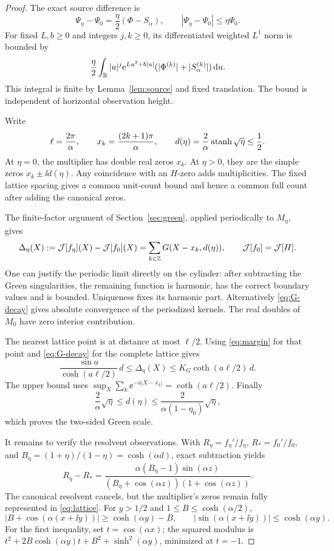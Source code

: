 \begin{proof}
The exact source difference is
\[
 \Psi_\eta-\Psi_0=\frac\eta2(\Phi-S_\alpha),\qquad
 |\Psi_\eta-\Psi_0|\le\eta\Psi_0.
\]
For fixed \(L,b\ge0\) and integers \(j,k\ge0\), its differentiated
weighted \(L^1\) norm is bounded by
\[
 \frac\eta2\int_\mathbb R |u|^j\mathrm e^{Lu^2+b|u|}
            (|\Phi^{(k)}|+|S_\alpha^{(k)}|)\,\mathrm d u.
\]
This integral is finite by Lemma~\ref{lem:source} and fixed translation.
The bound is independent of horizontal observation height.

Write
\[
 \ell=\frac{2\pi}{\alpha},\qquad
 x_k=\frac{(2k+1)\pi}{\alpha},\qquad
 d(\eta)=\frac2\alpha\operatorname{atanh}\sqrt\eta\le\frac12.
\]
At \(\eta=0\), the multiplier has double real zeros \(x_k\).
At \(\eta>0\), they are the simple zeros \(x_k\pm\ii d(\eta)\).
Any coincidence with an \(H\)-zero adds multiplicities. The fixed
lattice spacing gives a common unit-count bound and hence a common
full count after adding the canonical zeros.

The finite-factor argument of Section~\ref{sec:green}, applied
periodically to \(M_\eta\), gives
\begin{equation}\label{eq:lattice}
 \Delta_\eta(X):=\mathcal J[f_\eta](X)-\mathcal J[f_0](X)
       =\sum_{k\in\mathbb Z}G(X-x_k,d(\eta)),\qquad
 \mathcal J[f_0]=\mathcal J[H].
\end{equation}
One can justify the periodic limit directly on the cylinder: after
subtracting the Green singularities, the remaining function is
harmonic, has the correct boundary values and is bounded. Uniqueness
fixes its harmonic part. Alternatively \eqref{eq:G-decay} gives
absolute convergence of the periodized kernels. The real doubles of
\(M_0\) have zero interior contribution.

The nearest lattice point is at distance at most \(\ell/2\).
Using \eqref{eq:margin} for that point and
\eqref{eq:G-decay} for the complete lattice gives
\begin{equation}\label{eq:lattice-bounds}
 \frac{\sin a}{\cosh(a\ell/2)}\,d
 \le\Delta_\eta(X)
 \le K_G\coth(a\ell/2)\,d .
\end{equation}
The upper bound uses
\(\sup_X\sum_k\ee^{-a|X-x_k|}=\coth(a\ell/2)\).
Finally
\[
 \frac2\alpha\sqrt\eta\le d(\eta)
 \le\frac{2}{\alpha(1-\eta_0)}\sqrt\eta,
\]
which proves the two-sided Green scale.

It remains to verify the resolvent observations. With
\(R_\eta=f_\eta'/f_\eta\), \(R_*=f_0'/f_0\), and
\(B_\eta=(1+\eta)/(1-\eta)=\cosh(\alpha d)\), exact subtraction yields
\begin{equation}\label{eq:resolvent-difference}
 R_\eta-R_*=
 \frac{\alpha(B_\eta-1)\sin(\alpha z)}
 {(B_\eta+\cos(\alpha z))(1+\cos(\alpha z))}.
\end{equation}
The canonical resolvent cancels, but the multiplier's zeros remain
fully represented in \eqref{eq:lattice}. For \(y>1/2\) and
\(1\le B\le\cosh(\alpha/2)\),
\[
 |B+\cos(\alpha(x+\ii y))|\ge\cosh(\alpha y)-B,\qquad
 |\sin(\alpha(x+\ii y))|\le\cosh(\alpha y).
\]
For the first inequality, set \(t=\cos(\alpha x)\); the squared
modulus is \(t^2+2B\cosh(\alpha y)t+B^2+\sinh^2(\alpha y)\),
minimized at \(t=-1\).


\end{proof}

